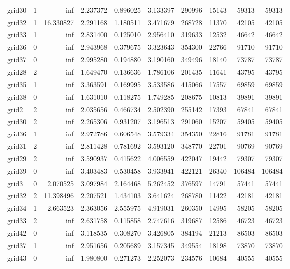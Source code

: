 \documentclass[../../../thesis.tex]{subfiles}
\begin{document}
\begin{longtable}{|l|r|r|r|r|r|r|r|r|r|}
grid30 & 1 & inf & 2.237372 & 0.896025 & 3.133397 & 290996 & 15143 & 59313 & 59313 \\
grid32 & 1 & 16.330827 & 2.291168 & 1.180511 & 3.471679 & 268728 & 11370 & 42105 & 42105 \\
grid33 & 1 & inf & 2.831400 & 0.125010 & 2.956410 & 319633 & 12532 & 46642 & 46642 \\
grid36 & 0 & inf & 2.943968 & 0.379675 & 3.323643 & 354300 & 22766 & 91710 & 91710 \\
grid37 & 0 & inf & 2.995280 & 0.194880 & 3.190160 & 349496 & 18140 & 73787 & 73787 \\
grid28 & 2 & inf & 1.649470 & 0.136636 & 1.786106 & 201435 & 11641 & 43795 & 43795 \\
grid35 & 1 & inf & 3.363591 & 0.169995 & 3.533586 & 415066 & 17557 & 69859 & 69859 \\
grid38 & 0 & inf & 1.631010 & 0.118275 & 1.749285 & 208675 & 10813 & 39891 & 39891 \\
grid2 & 2 & inf & 2.035656 & 0.466734 & 2.502390 & 255142 & 17393 & 67841 & 67841 \\
grid30 & 2 & inf & 2.265306 & 0.931207 & 3.196513 & 291060 & 15207 & 59405 & 59405 \\
grid36 & 1 & inf & 2.972786 & 0.606548 & 3.579334 & 354350 & 22816 & 91781 & 91781 \\
grid31 & 2 & inf & 2.811428 & 0.781692 & 3.593120 & 348770 & 22701 & 90769 & 90769 \\
grid29 & 2 & inf & 3.590937 & 0.415622 & 4.006559 & 422047 & 19442 & 79307 & 79307 \\
grid39 & 0 & inf & 3.403483 & 0.530458 & 3.933941 & 422121 & 26340 & 106484 & 106484 \\
grid3 & 0 & 2.070525 & 3.097984 & 2.164468 & 5.262452 & 376597 & 14791 & 57441 & 57441 \\
grid32 & 2 & 11.398496 & 2.207521 & 1.434103 & 3.641624 & 268780 & 11422 & 42181 & 42181 \\
grid34 & 1 & 2.663523 & 2.363056 & 2.555975 & 4.919031 & 260350 & 14995 & 58205 & 58205 \\
grid33 & 2 & inf & 2.631758 & 0.115858 & 2.747616 & 319687 & 12586 & 46723 & 46723 \\
grid42 & 0 & inf & 3.118535 & 0.308270 & 3.426805 & 384194 & 21213 & 86503 & 86503 \\
grid37 & 1 & inf & 2.951656 & 0.205689 & 3.157345 & 349554 & 18198 & 73870 & 73870 \\
grid43 & 0 & inf & 1.980800 & 0.271273 & 2.252073 & 234576 & 10684 & 40555 & 40555 \\

\end{longtable}
\end{document}
